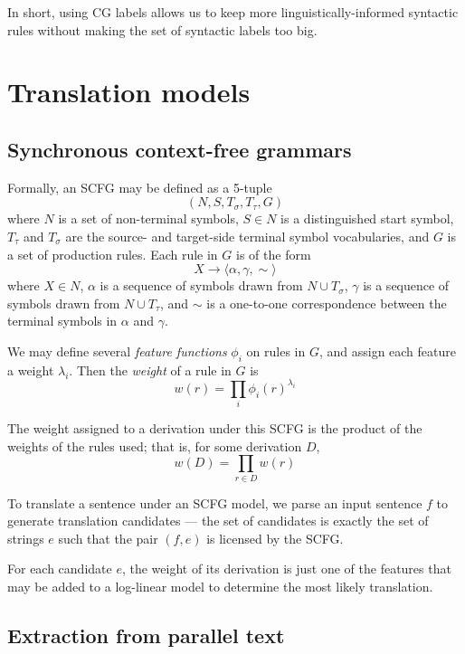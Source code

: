 \documentclass[a4paper]{article}
\begin{document}
In short, using CG labels allows us to keep more linguistically-informed syntactic rules without making the set of syntactic labels too big.

\section{Translation models}

\subsection{Synchronous context-free grammars}

Formally, an SCFG may be defined as a 5-tuple
$$(N,S,T_\sigma,T_\tau,G)$$
where $N$ is a set of non-terminal symbols, $S \in N$ is a distinguished start symbol, $T_\tau$ and $T_\sigma$ are the source- and target-side terminal symbol vocabularies, and $G$ is a set of production rules. Each rule in $G$ is of the form
$$X \to \langle \alpha, \gamma, \sim \rangle$$
where $X \in N$, $\alpha$ is a sequence of symbols drawn from $N \cup T_\sigma$, $\gamma$ is a sequence of symbols drawn from $N \cup T_\tau$, and $\sim$ is a one-to-one correspondence between the terminal symbols in $\alpha$ and $\gamma$.

We may define several {\em feature functions} $\phi_i$ on rules in $G$, and assign each feature a weight $\lambda_i$. Then the {\em weight} of a rule in $G$ is
\begin{equation}
w(r) = \prod_i{\phi_i(r)^{\lambda_i}}
\end{equation}

The weight assigned to a derivation under this SCFG is the product of the weights of the rules used; that is, for some derivation $D$,
\begin{equation}
w(D) = \prod_{r \in D}{w(r)}
\end{equation}

To translate a sentence under an SCFG model, we parse an input sentence $f$ to generate translation candidates --- the set of candidates is exactly the set of strings $e$ such that the pair $(f,e)$ is licensed by the SCFG.

For each candidate $e$, the weight of its derivation is just one of the features that may be added to a log-linear model to determine the most likely translation.

\subsection{Extraction from parallel text}
\end{document}
